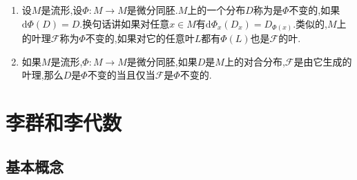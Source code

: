 \begin{enumerate}
\begin{proof}
		任取点$p\in M$,记$L_p$表示所有经过点$p$的关于$D$的连通积分流形的并,按照上面引理这个$L_p$是经过点$p$的关于$D$的连通积分流形.所以这自然是极大的.如果两个$L_p$和$L_{p'}$的交非空,那么按照引理有$L_p\cup L_{p'}$也是连通积分流形,极大性就保证$L_p=L_{p'}$.所以这些极大的连通积分流形要么不交要么相同.所以它们的并是整个$M$.
		
		设$(U,\varphi)$是关于$D$的平坦坐标卡,按照积分流形的局部结构定理,有$L_p\cap U$是至多可数个切片的开子集的并.对每个这样的切片$S$,如果$L_p\cap S$非空并且不是整个$S$,那么$L_p\cup S$是一个严格包含$S$的连通积分流形,这和极大性矛盾,所以$L_p\cap U$恰有由至多可数个切片的并构成.所以$U$就是关于这族极大积分流形的平坦坐标卡,这说明是一个叶理.
	\end{proof}
    \item 设$M$是流形,设$\Phi:M\to M$是微分同胚.$M$上的一个分布$D$称为是$\Phi$不变的,如果$\mathrm{d}\Phi(D)=D$.换句话讲如果对任意$x\in M$有$\mathrm{d}\Phi_x(D_x)=D_{\Phi(x)}$.类似的,$M$上的叶理$\mathscr{F}$称为$\Phi$不变的,如果对它的任意叶$L$都有$\Phi(L)$也是$\mathscr{F}$的叶.
    \item 如果$M$是流形,$\Phi:M\to M$是微分同胚,如果$D$是$M$上的对合分布,$\mathscr{F}$是由它生成的叶理,那么$D$是$\Phi$不变的当且仅当$\mathscr{F}$是$\Phi$不变的.
\end{enumerate}

\newpage
\section{李群和李代数}
\subsection{基本概念}


